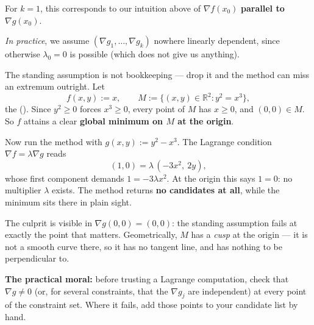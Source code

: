 For $k = 1$, this corresponds to our intuition above of $\nabla f(x_0)$ \textbf{parallel to}
$\nabla g(x_0)$.

\textit{In practice}, we assume $(\nabla g_1, \dots, \nabla g_k)$ nowhere linearly dependent,
since otherwise $\lambda_0 = 0$ is possible (which does not give us anything).

\begin{aiexample}
\label{ex:constraint_qualification_fails}
The standing assumption is not bookkeeping --- drop it and the method can miss an extremum
outright. Let
\[f(x,y) := x, \qquad M := \{(x,y) \in \mathbb{R}^2 : y^2 = x^3\},\]
the  (). Since $y^2 \geq 0$ forces
$x^3 \geq 0$, every point of $M$ has $x \geq 0$, and $(0,0) \in M$. So $f$ attains a clear
\textbf{global minimum on $M$ at the origin}.

Now run the method with $g(x,y) := y^2-x^3$. The Lagrange condition $\nabla f = \lambda\nabla g$
reads
\[(1,0) = \lambda\,(-3x^2,\ 2y),\]
whose first component demands $1 = -3\lambda x^2$. At the origin this says $1 = 0$: no
multiplier $\lambda$ exists. The method returns \textbf{no candidates at all}, while the minimum
sits there in plain sight.

The culprit is visible in $\nabla g(0,0) = (0,0)$: the standing assumption fails at exactly the
point that matters. Geometrically, $M$ has a \emph{cusp} at the origin --- it is not a smooth
curve there, so it has no tangent line, and  has
nothing to be perpendicular to.

\textbf{The practical moral:} before trusting a Lagrange computation, check that
$\nabla g \neq 0$ (or, for several constraints, that the $\nabla g_j$ are independent) at every
point of the constraint set. Where it fails, add those points to your candidate list by hand.
\end{aiexample}

